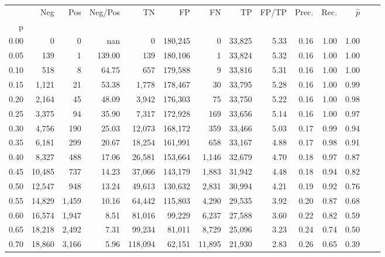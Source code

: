 \begin{tabular}{rrrrrrrrrrrrrr}
\toprule
{} &     Neg &    Pos & Neg/Pos &       TN &       FP &      FN &      TP & FP/TP & Prec. &  Rec. & $\hat{p}$ \\
p    &         &        &         &          &          &         &         &       &       &       &           \\
\midrule
0.00 &       0 &      0 &     nan &        0 &  180,245 &       0 &  33,825 &  5.33 &  0.16 &  1.00 &      1.00 \\
0.05 &     139 &      1 &  139.00 &      139 &  180,106 &       1 &  33,824 &  5.32 &  0.16 &  1.00 &      1.00 \\
0.10 &     518 &      8 &   64.75 &      657 &  179,588 &       9 &  33,816 &  5.31 &  0.16 &  1.00 &      1.00 \\
0.15 &   1,121 &     21 &   53.38 &    1,778 &  178,467 &      30 &  33,795 &  5.28 &  0.16 &  1.00 &      0.99 \\
0.20 &   2,164 &     45 &   48.09 &    3,942 &  176,303 &      75 &  33,750 &  5.22 &  0.16 &  1.00 &      0.98 \\
0.25 &   3,375 &     94 &   35.90 &    7,317 &  172,928 &     169 &  33,656 &  5.14 &  0.16 &  1.00 &      0.97 \\
0.30 &   4,756 &    190 &   25.03 &   12,073 &  168,172 &     359 &  33,466 &  5.03 &  0.17 &  0.99 &      0.94 \\
0.35 &   6,181 &    299 &   20.67 &   18,254 &  161,991 &     658 &  33,167 &  4.88 &  0.17 &  0.98 &      0.91 \\
0.40 &   8,327 &    488 &   17.06 &   26,581 &  153,664 &   1,146 &  32,679 &  4.70 &  0.18 &  0.97 &      0.87 \\
0.45 &  10,485 &    737 &   14.23 &   37,066 &  143,179 &   1,883 &  31,942 &  4.48 &  0.18 &  0.94 &      0.82 \\
0.50 &  12,547 &    948 &   13.24 &   49,613 &  130,632 &   2,831 &  30,994 &  4.21 &  0.19 &  0.92 &      0.76 \\
0.55 &  14,829 &  1,459 &   10.16 &   64,442 &  115,803 &   4,290 &  29,535 &  3.92 &  0.20 &  0.87 &      0.68 \\
0.60 &  16,574 &  1,947 &    8.51 &   81,016 &   99,229 &   6,237 &  27,588 &  3.60 &  0.22 &  0.82 &      0.59 \\
0.65 &  18,218 &  2,492 &    7.31 &   99,234 &   81,011 &   8,729 &  25,096 &  3.23 &  0.24 &  0.74 &      0.50 \\
0.70 &  18,860 &  3,166 &    5.96 &  118,094 &   62,151 &  11,895 &  21,930 &  2.83 &  0.26 &  0.65 &      0.39 \\

\end{tabular}
